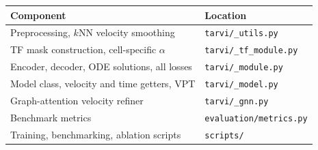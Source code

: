\documentclass[11pt,a4paper]{article}
\theoremstyle{definition}
\begin{document}
\begin{center}
\begin{tabular}{@{}ll@{}}
\toprule
\textbf{Component} & \textbf{Location} \\
\midrule
Preprocessing, $k$NN velocity smoothing & \texttt{tarvi/\_utils.py} \\
TF mask construction, cell-specific $\alpha$ & \texttt{tarvi/\_tf\_module.py} \\
Encoder, decoder, ODE solutions, all losses & \texttt{tarvi/\_module.py} \\
Model class, velocity and time getters, VPT & \texttt{tarvi/\_model.py} \\
Graph-attention velocity refiner & \texttt{tarvi/\_gnn.py} \\
Benchmark metrics & \texttt{evaluation/metrics.py} \\
Training, benchmarking, ablation scripts & \texttt{scripts/} \\
\bottomrule
\end{tabular}
\end{center}
\end{document}
